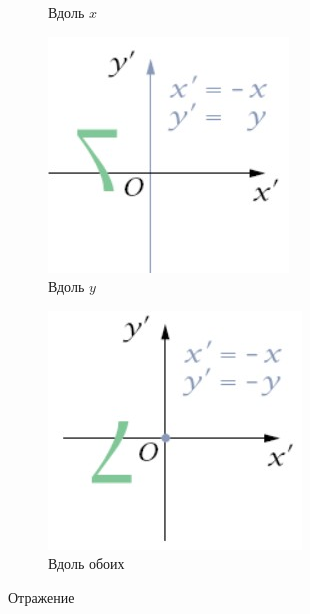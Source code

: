 \documentclass[a4paper, 14pt]{extarticle}
\begin{document}
\begin{figure}[h]
\begin{subfigure}[b]{0.2\textwidth}
		\caption{Вдоль $x$}
	\end{subfigure}
	\begin{subfigure}[b]{0.2\textwidth}
		\centering
		\includegraphics[width=\textwidth]{l3/S012.jpg}
		\caption{Вдоль $y$}
	\end{subfigure}
	\begin{subfigure}[b]{0.2\textwidth}
		\centering
		\includegraphics[width=\textwidth]{l3/S013.jpg}
		\caption{Вдоль обоих}
	\end{subfigure}
	\caption{Отражение}
\end{figure}
\end{document}
